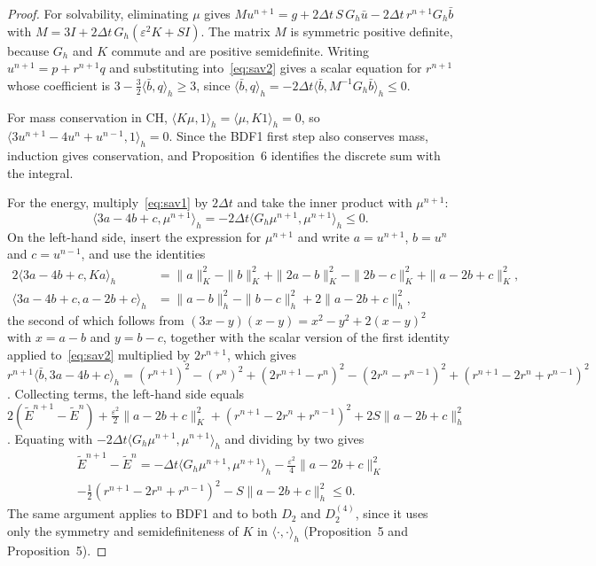 \documentclass[11pt]{article}
\begin{document}
\begin{proof}
For solvability, eliminating $\mu$ gives $Mu^{n+1}=g+2\Delta t\,S\,G_h\bar u-2\Delta t\,r^{n+1}G_h\bar b$
with $M=3I+2\Delta t\,G_h(\varepsilon^2K+SI)$. The matrix $M$ is symmetric positive definite, because $G_h$
and $K$ commute and are positive semidefinite. Writing $u^{n+1}=p+r^{n+1}q$ and substituting
into~\eqref{eq:sav2} gives a scalar equation for $r^{n+1}$ whose coefficient is
$3-\tfrac32\langle\bar b,q\rangle_h\ge3$, since
$\langle\bar b,q\rangle_h=-2\Delta t\langle\bar b,M^{-1}G_h\bar b\rangle_h\le0$.

For mass conservation in CH, $\langle K\mu,1\rangle_h=\langle\mu,K1\rangle_h=0$, so
$\langle3u^{n+1}-4u^n+u^{n-1},1\rangle_h=0$. Since the BDF1 first step also conserves mass, induction gives
conservation, and Proposition~6 identifies the discrete sum with the integral.

For the energy, multiply~\eqref{eq:sav1} by $2\Delta t$ and take the inner product with $\mu^{n+1}$:
\[
\langle3a-4b+c,\mu^{n+1}\rangle_h=-2\Delta t\langle G_h\mu^{n+1},\mu^{n+1}\rangle_h\le0 .
\]
On the left-hand side, insert the expression for $\mu^{n+1}$ and write $a=u^{n+1}$, $b=u^n$ and
$c=u^{n-1}$, and use the identities
\begin{align*}
2\langle3a-4b+c,Ka\rangle_h&=\|a\|_K^2-\|b\|_K^2+\|2a-b\|_K^2-\|2b-c\|_K^2+\|a-2b+c\|_K^2,\\
\langle3a-4b+c,a-2b+c\rangle_h&=\|a-b\|_h^2-\|b-c\|_h^2+2\|a-2b+c\|_h^2,
\end{align*}
the second of which follows from $(3x-y)(x-y)=x^2-y^2+2(x-y)^2$ with $x=a-b$ and $y=b-c$, together with
the scalar version of the first identity applied to~\eqref{eq:sav2} multiplied by $2r^{n+1}$, which gives
$r^{n+1}\langle\bar b,3a-4b+c\rangle_h=(r^{n+1})^2-(r^n)^2+(2r^{n+1}-r^n)^2-(2r^n-r^{n-1})^2+(r^{n+1}-2r^n+r^{n-1})^2$.
Collecting terms, the left-hand side equals
$2(\tilde E^{n+1}-\tilde E^n)+\tfrac{\varepsilon^2}{2}\|a-2b+c\|_K^2+(r^{n+1}-2r^n+r^{n-1})^2+2S\|a-2b+c\|_h^2$.
Equating with $-2\Delta t\langle G_h\mu^{n+1},\mu^{n+1}\rangle_h$ and dividing by two gives
\begin{multline*}
\tilde E^{n+1}-\tilde E^n=-\Delta t\langle G_h\mu^{n+1},\mu^{n+1}\rangle_h-\tfrac{\varepsilon^2}{4}\|a-2b+c\|_K^2\\
-\tfrac12(r^{n+1}-2r^n+r^{n-1})^2-S\|a-2b+c\|_h^2\le0.
\end{multline*}
The same argument applies to BDF1 and to both $D_2$ and $D_2^{(4)}$, since it uses only the symmetry and
semidefiniteness of $K$ in $\langle\cdot,\cdot\rangle_h$ (Proposition~5 and
Proposition~5).
\end{proof}
\end{document}
